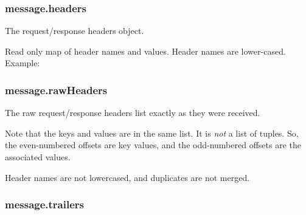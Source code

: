 \subsubsection{message.headers}\label{message.headers}

The request/response headers object.

Read only map of header names and values. Header names are lower-cased.
Example:

\begin{Shaded}
\begin{Highlighting}[]
\CommentTok{//}
\NormalTok{(}\NormalTok{);}
\end{Highlighting}
\end{Shaded}

\subsubsection{message.rawHeaders}\label{message.rawheaders}

The raw request/response headers list exactly as they were received.

Note that the keys and values are in the same list. It is \emph{not} a
list of tuples. So, the even-numbered offsets are key values, and the
odd-numbered offsets are the associated values.

Header names are not lowercased, and duplicates are not merged.

\begin{Shaded}
\begin{Highlighting}[]
\CommentTok{//}
\CommentTok{// [ 'user-agent',}
\CommentTok{//   '*/*' ]}
\NormalTok{(}\NormalTok{);}
\end{Highlighting}
\end{Shaded}

\subsubsection{message.trailers}\label{message.trailers}

